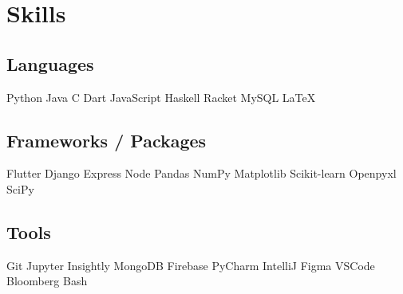 \documentclass[]{two-column}
\begin{document}
\begin{minipage}[t]{0.33\textwidth}



\section{Skills}
\vspace{1pt}
\subsection{Languages}
\vspace{1pt}
Python \textbullet{}   Java \textbullet{} C \textbullet{} Dart \textbullet{} JavaScript
 Haskell \textbullet{} Racket \textbullet{} MySQL \textbullet{} LaTeX\ \\
\vspace{5pt}
\subsection{Frameworks / Packages}
\vspace{1pt}
Flutter \textbullet{} Django \textbullet{} Express \textbullet{} Node Pandas \textbullet{} NumPy \textbullet{} Matplotlib Scikit-learn \textbullet{} Openpyxl \textbullet{} SciPy 
\vspace{5pt}
\subsection{Tools}
\vspace{1pt}
Git \textbullet{} Jupyter \textbullet{} Insightly \textbullet{} MongoDB Firebase \textbullet{} PyCharm \textbullet{} IntelliJ \textbullet{} Figma VSCode \textbullet{} Bloomberg \textbullet{} Bash \\ 
\vspace{5pt}

\end{minipage}
\end{document}
